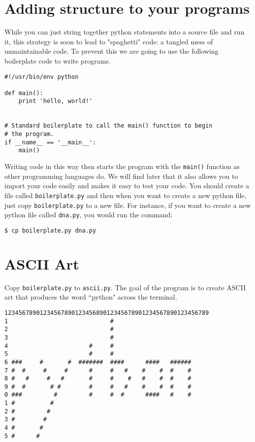 \documentclass[12pt]{article}
\begin{document}
\section*{Adding structure to your programs}

While you can just string together python statements into a source file and run it, this strategy is soon to lead to "spaghetti" code: a tangled mess of unmaintainable code. To prevent this we are going to use the following boilerplate code to write programs.

\begin{lstlisting}[style=c]
#!/usr/bin/env python

def main():
    print 'hello, world!'


# Standard boilerplate to call the main() function to begin
# the program.
if __name__ == '__main__':
    main()
\end{lstlisting}

Writing code in this way then starts the program with the \texttt{main()} function as other programming languages do. We will find later that it also allows you to import your code easily and makes it easy to test your code. You should create a file called \texttt{boilerplate.py} and then when you want to create a new python file, just copy \texttt{boilerplate.py} to a new file. For instance, if you want to create a new python file called \texttt{dna.py}, you would run the command:

\begin{lstlisting}[style=bash]
$ cp boilerplate.py dna.py
\end{lstlisting}

\pagebreak

\section{ASCII Art}

Copy \texttt{boilerplate.py} to \texttt{ascii.py}. The goal of the program is to create ASCII art that produces the word ``python" across the terminal.


\begin{lstlisting}[style=bash]
 1234567890123456789012345689012345678901234567890123456789
1                             #     
2                             #
3                             #
4                       #     #
5                       #     #                
6 ###     #       #  #######  ####      ####   ######     
7 #  #     #     #      #     #   #    #    #  #    #
8 #   #     #   #       #     #    #   #    #  #    #
9 #  #       # #        #     #   #    #    #  #    #
0 ###         #         #     #  #      ####   #    #
1 #          #       
2 #         #
3 #        #
4 #       #
5 #      #
\end{lstlisting}
\end{document}
